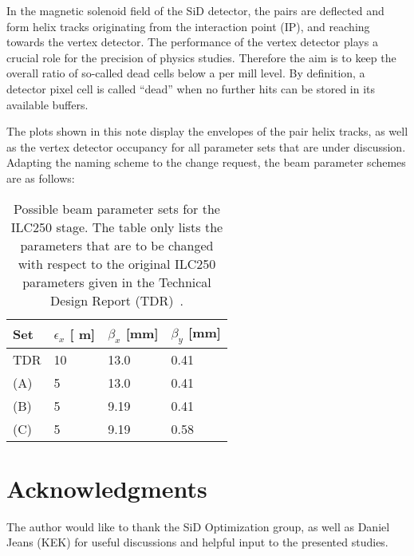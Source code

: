 \documentclass[12pt]{article}
\newcommand{\murm}{%
  \ifmmode
    \mathchoice
        {\hbox{\normalsize\textmu}}
        {\hbox{\normalsize\textmu}}
        {\hbox{\scriptsize\textmu}}
        {\hbox{\tiny\textmu}}%
  \else
    \textmu
  \fi
}
\begin{document}
In the magnetic solenoid field of the SiD detector, the pairs are deflected and form helix tracks originating from the interaction point (IP), and reaching towards the vertex detector.
The performance of the vertex detector plays a crucial role for the precision of physics studies.
Therefore the aim is to keep the overall ratio of so-called dead cells below a per mill level.
By definition, a detector pixel cell is called ``dead'' when no further hits can be stored in its available buffers. 

The plots shown in this note display the envelopes of the pair helix tracks, as well as the vertex detector occupancy for all parameter sets that are under discussion.
Adapting the naming scheme to the change request, the beam parameter schemes are as follows:
\begin{table}
\caption{Possible beam parameter sets for the ILC250 stage. 
The table only lists the parameters that are to be changed with respect to the original ILC250 parameters given in the Technical Design Report (TDR)~\cite[p. 11]{TDR1}.}
\label{tab:ILC250_sets}
\centering
\begin{tabularx}{0.53\textwidth}{llll}
\hline\hline
\textbf{Set}  & \textbf{$\epsilon_x$ [\murm m]} & \textbf{$\beta_x$ [mm]} & \textbf{$\beta_y$ [mm]}\\
\hline
TDR & 10 & 13.0 & 0.41\\
 (A) & 5 & 13.0 & 0.41\\
 (B) & 5 & 9.19 & 0.41\\
 (C) & 5 & 9.19 & 0.58 \\
\hline\hline
\end{tabularx}
\end{table}

%
%


\section*{Acknowledgments}
The author would like to thank the SiD Optimization group, as well as Daniel Jeans (KEK) for useful discussions and helpful input to the presented studies.

%




\end{document}
